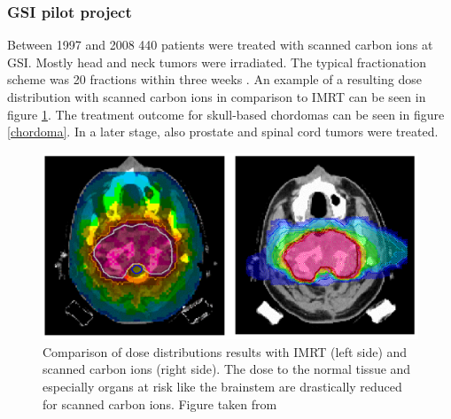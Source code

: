 \newpage

\subsubsection*{GSI pilot project}

Between 1997 and 2008 440 patients were treated with scanned carbon ions at GSI. Mostly head and neck tumors were irradiated. 
The typical fractionation scheme was 20 fractions within three weeks \cite{Schu07}. An example of a resulting 
dose distribution with scanned carbon ions in comparison to IMRT can be seen in figure \ref{targetvergleich}. 
The treatment outcome for skull-based chordomas can be seen in figure \ref{chordoma}. In a later stage, also prostate and spinal cord 
tumors were treated.

\begin{figure}[H]
\begin{center}
\includegraphics[scale=0.25]{./teile/introduction/targetvergleich.png}
\caption{Comparison of dose distributions results with IMRT (left side) and scanned carbon ions (right side). The dose to the normal 
tissue and especially organs at risk like the brainstem are drastically reduced for scanned carbon ions. Figure taken from \cite{Gro04}}
\label{targetvergleich}
\end{center}
\end{figure}

\vspace*{-1cm}


